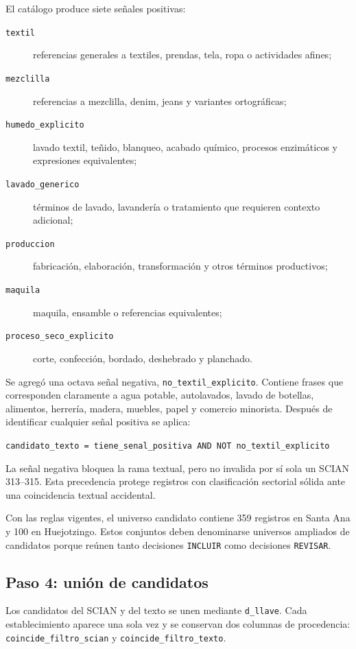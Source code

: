 \documentclass[11pt,letterpaper]{article}
\begin{document}
El catálogo produce siete señales positivas:

\begin{description}
  \item[\texttt{textil}] referencias generales a textiles, prendas, tela, ropa o actividades afines;
  \item[\texttt{mezclilla}] referencias a mezclilla, denim, jeans y variantes ortográficas;
  \item[\texttt{humedo\_explicito}] lavado textil, teñido, blanqueo, acabado químico, procesos enzimáticos y expresiones equivalentes;
  \item[\texttt{lavado\_generico}] términos de lavado, lavandería o tratamiento que requieren contexto adicional;
  \item[\texttt{produccion}] fabricación, elaboración, transformación y otros términos productivos;
  \item[\texttt{maquila}] maquila, ensamble o referencias equivalentes;
  \item[\texttt{proceso\_seco\_explicito}] corte, confección, bordado, deshebrado y planchado.
\end{description}

Se agregó una octava señal negativa, \texttt{no\_textil\_explicito}. Contiene frases que corresponden claramente a agua potable, autolavados, lavado de botellas, alimentos, herrería, madera, muebles, papel y comercio minorista. Después de identificar cualquier señal positiva se aplica:

\begin{center}
\texttt{candidato\_texto = tiene\_senal\_positiva AND NOT no\_textil\_explicito}
\end{center}

La señal negativa bloquea la rama textual, pero no invalida por sí sola un SCIAN 313--315. Esta precedencia protege registros con clasificación sectorial sólida ante una coincidencia textual accidental.

Con las reglas vigentes, el universo candidato contiene 359 registros en Santa Ana y 100 en Huejotzingo. Estos conjuntos deben denominarse universos ampliados de candidatos porque reúnen tanto decisiones \texttt{INCLUIR} como decisiones \texttt{REVISAR}.

\subsection{Paso 4: unión de candidatos}

Los candidatos del SCIAN y del texto se unen mediante \texttt{d\_llave}. Cada establecimiento aparece una sola vez y se conservan dos columnas de procedencia: \texttt{coincide\_filtro\_scian} y \texttt{coincide\_filtro\_texto}.
\end{document}
